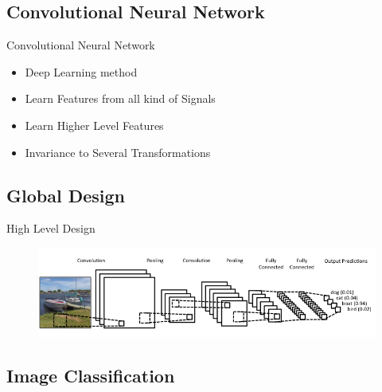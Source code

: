 \documentclass{beamer}
\begin{document}
    \subsection{Convolutional Neural Network}

    \begin{frame}{Convolutional Neural Network}

      \begin{center}
        \begin{itemize}
          \setlength\itemsep{1em}
          \item Deep Learning method
          \item Learn Features from all kind of Signals
          \item Learn Higher Level Features
          \item Invariance to Several Transformations
        \end{itemize}
      \end{center}

    \end{frame}

    \subsection{Global Design}

    \begin{frame}{High Level Design}
      \begin{figure}
        \par\medskip
        \includegraphics[scale=0.45]{images/slides/cnn_design.png}
      \end{figure}
    \end{frame}

    \subsection{Image Classification}
\end{document}
